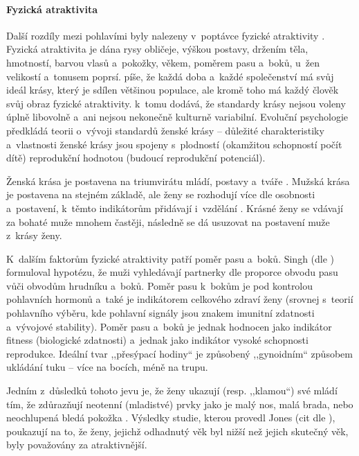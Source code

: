 \documentclass[a4paper, 12pt, notitlepage, oneside, numbers=noenddot]{report}
\begin{document}
\paragraph{Fyzická atraktivita}

Další rozdíly mezi pohlavími byly nalezeny v~poptávce fyzické
atraktivity \citep{Buss2007}.  Fyzická atraktivita je dána rysy
obličeje, výškou postavy, držením těla, hmotností, barvou vlasů
a~pokožky, věkem, poměrem pasu a~boků, u~žen velikostí a~tonusem
poprsí.  \citet{Slamenik2008} píše, že každá doba a~každé společenství
má svůj ideál krásy, který je sdílen většinou populace, ale kromě toho
má každý člověk svůj obraz fyzické atraktivity.  \citet{Buss2007}
k~tomu dodává, že standardy krásy nejsou voleny úplně libovolně a~ani
nejsou nekonečně kulturně variabilní.  Evoluční psychologie předkládá
teorii o~vývoji standardů ženské krásy -- důležité charakteristiky
a~vlastnosti ženské krásy jsou spojeny s~plodností (okamžitou
schopností počít dítě) reprodukční hodnotou (budoucí
reprodukční potenciál).

Ženská krása je postavena na triumvirátu mládí, postavy a~tváře
\citep{Ridley2007, BussSchmitt1993}.  Mužská krása je postavena na
stejném základě, ale ženy se rozhodují více dle osobnosti a~postavení,
k~těmto indikátorům přidávají i~vzdělání \citep{Ridley2007,
  BussSchmitt1993, Buss2007}.  Krásné ženy se vdávají za bohaté muže
mnohem častěji, následně se dá usuzovat na postavení muže z~krásy ženy.

K~dalším faktorům fyzické atraktivity patří poměr pasu a~boků.  Singh
(dle \citealp{BarrettDunbarLycett2007, Ridley2007}) formuloval
hypotézu, že muži vyhledávají partnerky dle proporce obvodu pasu vůči
obvodům hrudníku a~boků.  Poměr pasu k~bokům je pod kontrolou
pohlavních hormonů a~také je indikátorem celkového zdraví ženy
(srovnej s~teorií pohlavního výběru, kde pohlavní signály jsou znakem
imunitní zdatnosti a~vývojové stability). Poměr pasu a~boků je jednak
hodnocen jako indikátor fitness (biologické zdatnosti) a~jednak jako
indikátor vysoké schopnosti reprodukce.  Ideální tvar ,,přesýpací
hodiny`` je způsobený ,,gynoidním`` způsobem ukládání tuku -- více na
bocích, méně na trupu.

Jedním z~důsledků tohoto jevu je, že ženy ukazují (resp. ,,klamou``)
své mládí tím, že zdůrazňují neotenní (mladistvé) prvky jako je malý
nos, malá brada, nebo neochlupená bledá pokožka \citep{Barber1995}.
Výsledky studie, kterou provedl Jones (cit dle
\citealp{BarrettDunbarLycett2007}), poukazují na to, že ženy, jejichž
odhadnutý věk byl nižší než jejich skutečný věk, byly považovány za
atraktivnější.
\end{document}
